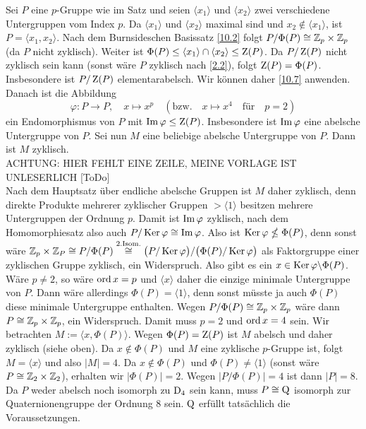 \begin{beweis}
 Sei $P$ eine $p$-Gruppe wie im Satz und seien $\langle x_1\rangle$ und $\langle x_2\rangle$ zwei verschiedene Untergruppen vom Index $p$. Da $\langle x_1\rangle$ und $\langle x_2\rangle$ maximal sind und $x_2\not\in \langle x_1\rangle$, ist $P=\langle x_1,x_2\rangle$. Nach dem Burnsideschen Basissatz \ref{10.2} folgt $P/\Phi(P)\cong\mathbb{Z}_p\times\mathbb{Z}_p$ (da $P$ nicht zyklisch). Weiter ist $\Phi(P)\leq \langle x_1\rangle\cap\langle x_2\rangle\leq\operatorname{Z}(P)$. Da $P/\operatorname{Z}(P)$ nicht zyklisch sein kann (sonst w\"are $P$ zyklisch nach \ref{2.2}), folgt $\operatorname{Z}(P)=\Phi(P)$. Insbesondere ist $P/\operatorname{Z}(P)$ elementarabelsch. Wir k\"onnen daher \ref{10.7} anwenden. Danach ist die Abbildung $$\varphi:P\to P, \quad x\mapsto x^p\quad (\text{bzw.}\quad x\mapsto x^4 \quad\text{f\"ur}\quad p=2)$$ ein Endomorphismus von $P$ mit $\operatorname{Im}\varphi\leq\operatorname{Z}(P)$. Insbesondere ist $\operatorname{Im} \varphi$ eine abelsche Untergruppe von $P$. Sei nun $M$ eine beliebige abelsche Untergruppe von $P$. Dann ist $M$ zyklisch.\\
ACHTUNG: HIER FEHLT EINE ZEILE, MEINE VORLAGE IST UNLESERLICH [ToDo]\\
Nach dem Hauptsatz \"uber endliche abelsche Gruppen ist $M$ daher zyklisch, denn direkte Produkte mehrerer zyklischer Gruppen $> \langle 1\rangle$ besitzen mehrere Untergruppen der Ordnung $p$.
Damit ist $\operatorname{Im}\varphi$ zyklisch, nach dem Homomorphiesatz also auch $P/\operatorname{Ker}\varphi\cong \operatorname{Im} \varphi$. Also ist $\operatorname{Ker}\varphi\nleq\Phi(P)$, denn sonst w\"are $\mathbb{Z}_p\times \mathbb{Z}_P\cong P/\Phi(P)\stackrel{\text{2.Isom.}}{\cong}\bigl(P/\operatorname{Ker}\varphi\bigr)/\bigl(\Phi(P)/\operatorname{Ker}\varphi\bigr)$ als Faktorgruppe einer zyklischen Gruppe zyklisch, ein Widerspruch.
Also gibt es ein $x\in \operatorname{Ker}\varphi\backslash\Phi(P)$.
W\"are $p\neq 2$, so w\"are $\operatorname{ord} x=p$ und $\langle x\rangle$ daher die einzige minimale Untergruppe von $P$. Dann w\"are allerdings $\Phi(P)=\langle 1\rangle$, denn sonst m\"usste ja auch $\Phi(P)$ diese minimale Untergruppe enthalten. Wegen $P/\Phi(P)\cong \mathbb{Z}_p\times\mathbb{Z}_p$ w\"are dann $P\cong\mathbb{Z}_p\times \mathbb{Z}_p$, ein Widerspruch.
Damit muss $p=2$ und $\operatorname{ord} x=4$ sein. Wir betrachten $M:=\langle x, \Phi(P)\rangle$. Wegen $\Phi(P)=\operatorname{Z}(P)$ ist $M$ abelsch und daher zyklisch (siehe oben). Da $x\not\in\Phi(P)$ und $M$ eine zyklische $p$-Gruppe ist, folgt $M=\langle x\rangle$ und also $\mathopen{|}M\mathclose{|}=4$. Da $x\not\in \Phi(P)$ und $\Phi(P)\neq\langle 1\rangle$ (sonst w\"are $P\cong \mathbb{Z}_2\times \mathbb{Z}_2$), erhalten wir $|\Phi(P)|=2$. Wegen $|P/\Phi(P)|=4$ ist dann $|P|=8$. Da $P$ weder abelsch noch isomorph zu $\operatorname{D}_4$ sein kann, muss $P\cong \operatorname{Q}$ isomorph zur Quaternionengruppe der Ordnung $8$ sein. $\operatorname{Q}$ erf\"ullt tats\"achlich die Voraussetzungen.
\end{beweis}


